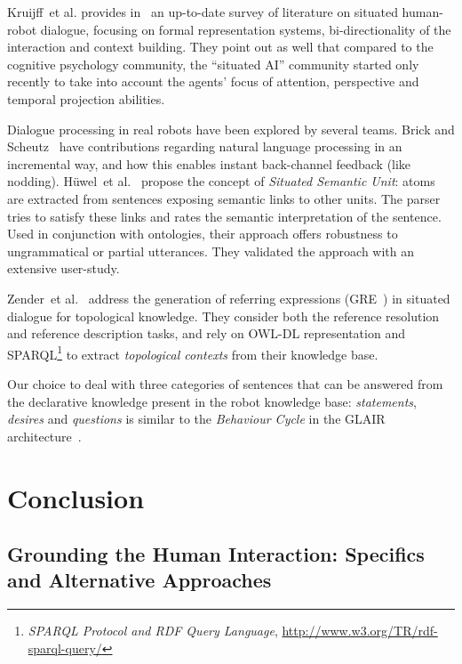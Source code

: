 \documentclass{svmult}
\newcommand{\etal}{et al.\xspace}
\begin{document}
Kruijff~\etal provides in~\cite{Kruijff2010} an up-to-date survey of
literature on situated human-robot dialogue, focusing on formal representation
systems, bi-directionality of the interaction and context building. They point
out as well that compared to the cognitive psychology community, the ``situated
AI'' community started only recently to take into account the agents' focus of
attention, perspective and temporal projection abilities.

Dialogue processing in real robots have been explored by several teams.  Brick
and Scheutz~\cite{Brick2007} have contributions regarding natural language
processing in an incremental way, and how this enables instant back-channel
feedback (like nodding). Hüwel~\etal~\cite{Huwel2006} propose the concept of
\textit{Situated Semantic Unit}: atoms are extracted from sentences exposing
semantic links to other units. The parser tries to satisfy these links and
rates the semantic interpretation of the sentence. Used in conjunction with
ontologies, their approach offers robustness to ungrammatical or partial
utterances. They validated the approach with an extensive user-study.

Zender~\etal~\cite{Zender2009} address the generation of referring expressions
(GRE~\cite{Dale1995}) in situated dialogue for topological knowledge.  They consider
both the reference resolution and reference description tasks, and rely on
OWL-DL representation and SPARQL\footnote{{\em SPARQL Protocol and RDF Query
Language}, \url{http://www.w3.org/TR/rdf-sparql-query/}} to extract
\emph{topological contexts} from their knowledge base.

Our choice to deal with three categories of sentences that can be answered from
the declarative knowledge present in the robot knowledge base:
\emph{statements}, \emph{desires} and \emph{questions} is similar to the
\emph{Behaviour Cycle} in the GLAIR architecture~\cite{Shapiro2009}.



\section{Conclusion}
\label{conclusion}

\subsection{Grounding the Human Interaction: Specifics and Alternative Approaches}
\label{sec|literature}
\end{document}

